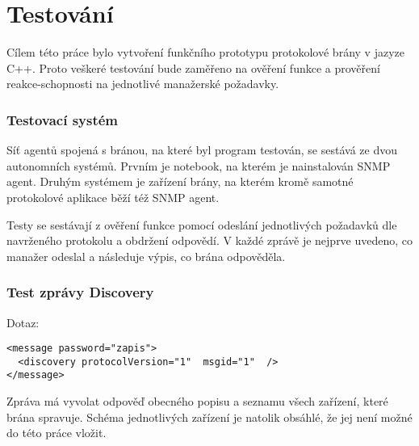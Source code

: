 \chapter{Testování}
\label{kap_testovani}
Cílem této práce bylo vytvoření funkčního prototypu protokolové brány v jazyze C++. Proto
veškeré testování bude zaměřeno na ověření funkce a prověření reakce-schopnosti na jednotlivé
manažerské požadavky.

\subsection*{Testovací systém}
Síť agentů spojená s bránou, na které byl program testován, se sestává ze dvou autonomních systémů.
Prvním je notebook, na kterém je nainstalován SNMP agent. Druhým systémem je zařízení brány, na kterém
kromě samotné protokolové aplikace běží též SNMP agent.

Testy se sestávají z ověření funkce pomocí odeslání jednotlivých požadavků dle navrženého protokolu a obdržení odpovědí.
V každé zprávě je nejprve uvedeno, co manažer odeslal a následuje výpis, co brána odpověděla.

\subsection*{Test zprávy Discovery}
Dotaz:
\begin{verbatim}
<message password="zapis">
  <discovery protocolVersion="1"  msgid="1"  />
</message>
\end{verbatim}

Zpráva má vyvolat odpověď obecného popisu a seznamu všech zařízení, které brána spravuje. Schéma
jednotlivých zařízení je natolik obsáhlé, že jej není možné do této práce vložit.

